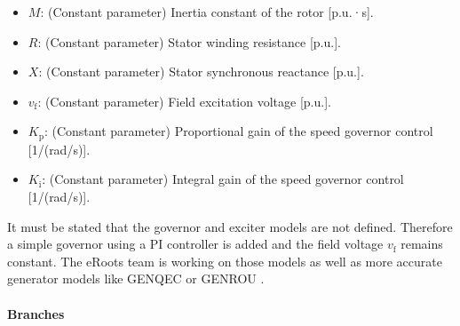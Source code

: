 \begin{itemize}
\begin{itemize}
  \item $M$: (Constant parameter) Inertia constant of the rotor [p.u.·s].
  \item $R$: (Constant parameter) Stator winding resistance [p.u.].
  \item $X$: (Constant parameter) Stator synchronous reactance [p.u.].
  \item $v_\text{f}$: (Constant parameter) Field excitation voltage [p.u.].
  \item $K_\text{p}$: (Constant parameter) Proportional gain of the speed governor control [1/(rad/s)].
  \item $K_\text{i}$: (Constant parameter) Integral gain of the speed governor control [1/(rad/s)].
\end{itemize}
\end{itemize}

It must be stated that the governor and exciter models are not defined. Therefore a simple governor using a PI controller is added and the field voltage $v_\text{f}$ remains constant. 
The eRoots team is working on those models as well as more accurate generator models like GENQEC or GENROU \cite{colib}.

\paragraph{Branches}


